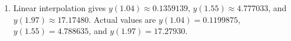 \begin{posttest}
\begin{mysolution}
\begin{enumerate}[label=\arabic*.]
\begin{enumerate}[label=(\alph*)]
\item Linear interpolation gives $y(1.04) \approx 0.1359139$, $y(1.55) \approx 4.777033$, and $y(1.97) \approx 17.17480$. Actual values are $y(1.04)=0.1199875$, $y(1.55)=4.788635$, and $y(1.97)=17.27930$.
%
%
\end{enumerate}


\end{enumerate}
\end{mysolution}
\end{posttest}
